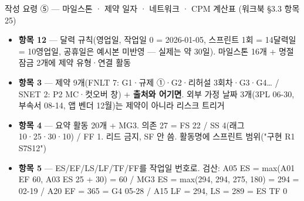 \begin{frame}{작성 요령 ⑤ — 마일스톤 · 제약 일자 · 네트워크 · CPM 계산표 (워크북 §3.3 항목 2\til{}5)}
\begin{itemize}
\item \textbf{항목 1\til{}2} — 달력 규칙(영업일, 작업일 0 = 2026-01-05, 스프린트 1회 = 14달력일 = 10영업일, 공휴일은 예시본 미반영 — 실제는 약 30일). 마일스톤 16개 + 명절 잠금 2개에 제약 유형·연결 활동
\item \textbf{항목 3} — 제약 9개(FNLT 7: G1·규제 ①·G2·리허설 3회차·G3·G4… / SNET 2: P2 MC·컷오버 창) + \textbf{출처와 어기면}. 외부 가정 날짜 3개(3PL 06-30, 부속서 08-14, 앱 벤더 12월)는 제약이 아니라 리스크 트리거
\item \textbf{항목 4} — 요약 활동 20개 + MG3. 의존 27 = FS 22 / SS 4(래그 10·25·30·10) / FF 1. 리드 금지, SF 안 씀. 활동명에 스프린트 범위("구현 R1 S7\til{}S12")
\item \textbf{항목 5} — ES/EF/LS/LF/TF/FF를 작업일 번호로. 검산: A05 ES = max(A01 EF 60, A03 ES 25 + 30) = 60 / MG3 ES = max(294, 294, 275, 180) = 294 = 02-19 / A20 EF = 365 = G4 05-28 / A15 LF = 294, LS = 289 = ES \ra{} TF 0
\end{itemize}
\end{frame}

